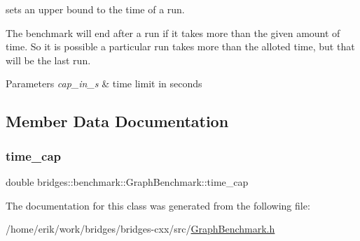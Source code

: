 sets an upper bound to the time of a run. 

The benchmark will end after a run if it takes more than the given amount of time. So it is possible a particular run takes more than the alloted time, but that will be the last run.


\begin{DoxyParams}{Parameters}
{\em cap\+\_\+in\+\_\+s} & time limit in seconds \\
\hline
\end{DoxyParams}


\subsection{Member Data Documentation}
\mbox{\label{classbridges_1_1benchmark_1_1_graph_benchmark_a59938016b721fb6db2ff8bdb2c9d41c1}} 
\subsubsection{\texorpdfstring{time\+\_\+cap}{time\_cap}}
{\footnotesize\ttfamily double bridges\+::benchmark\+::\+Graph\+Benchmark\+::time\+\_\+cap\hspace{0.3cm}{\ttfamily [protected]}}



The documentation for this class was generated from the following file\+:\begin{DoxyCompactItemize}
\item 
/home/erik/work/bridges/bridges-\/cxx/src/\hyperlink{_graph_benchmark_8h}{Graph\+Benchmark.\+h}\end{DoxyCompactItemize}
